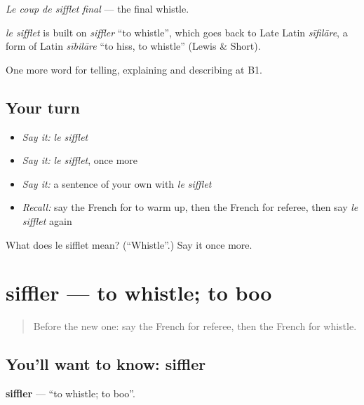 \emph{Le coup de sifflet final} — the final whistle.

\begin{cousinweb}
\emph{le sifflet} is built on \emph{siffler} \textquotedblleft{}to whistle\textquotedblright{}, which goes back to Late Latin \emph{sīfilāre}, a form of Latin \emph{sībilāre} \textquotedblleft{}to hiss, to whistle\textquotedblright{} (Lewis \& Short).
\end{cousinweb}

\begin{grammarlens}[title={What you've built}]
One more word for telling, explaining and describing at B1.
\end{grammarlens}

\subsection*{Your turn}
\begin{itemize}
\raggedright
  \item \emph{Say it:} \emph{le sifflet}
  \item \emph{Say it:} \emph{le sifflet}, once more
  \item \emph{Say it:} a sentence of your own with \emph{le sifflet}
  \item \emph{Recall:} say the French for to warm up, then the French for referee, then say \emph{le sifflet} again
\end{itemize}

\begin{tcolorbox}[breakable,colback=teal!4,colframe=teal!35!black,title={Before you move on}]
What does le sifflet mean? (\textquotedblleft{}Whistle\textquotedblright{}.) Say it once more.
\end{tcolorbox}
\section[siffler]{siffler — to whistle; to boo}

\label{lesson:FR-C505-siffler}



\begin{quote}
Before the new one: say the French for referee, then the French for whistle.
\end{quote}

\subsection*{You'll want to know: siffler}
\textbf{siffler} — \textquotedblleft{}to whistle; to boo\textquotedblright{}.

